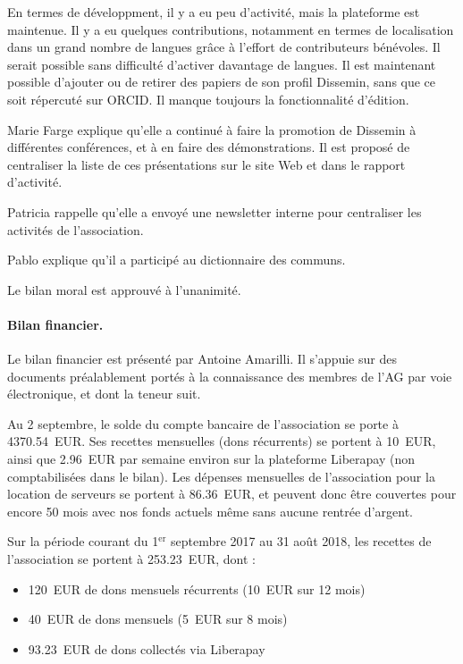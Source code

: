 \documentclass{scrartcl}
\begin{document}
En termes de développment, il y a eu peu d'activité, mais la plateforme est
maintenue. Il y a eu quelques contributions, notamment en termes de
localisation dans un grand nombre de langues grâce à l'effort de contributeurs
bénévoles. Il serait possible sans difficulté d'activer davantage de langues. Il
est maintenant possible d'ajouter ou de retirer des papiers de son profil
Dissemin, sans que ce soit répercuté sur ORCID. Il manque toujours la
fonctionnalité d'édition.

Marie Farge explique qu'elle a continué à faire la promotion de Dissemin à
différentes conférences, et à en faire des démonstrations. Il est proposé de
centraliser la liste de ces présentations sur le site Web et dans le rapport
d'activité.

Patricia rappelle qu'elle a envoyé une newsletter interne pour centraliser les
activités de l'association.

Pablo explique qu'il a participé au dictionnaire des communs.

Le bilan moral est approuvé à l'unanimité.

\paragraph{Bilan financier.} Le bilan financier est présenté par Antoine
Amarilli. Il s'appuie sur des documents préalablement portés à la connaissance des
membres de l'AG par voie électronique, et dont la teneur suit.

Au 2 septembre, le solde du compte bancaire de l'association se porte à
4370.54~EUR. Ses recettes mensuelles (dons récurrents) se portent à 10~EUR,
ainsi que 2.96~EUR par semaine environ sur la plateforme Liberapay (non
comptabilisées dans le bilan). Les dépenses mensuelles de l'association pour la
location de serveurs se portent à 86.36~EUR, et peuvent donc être couvertes pour
encore 50 mois avec nos fonds actuels même sans aucune rentrée d'argent.
 
Sur la période courant du 1$^{\mathrm{er}}$ septembre 2017 au 31 août 2018, les
recettes de l'association se portent à 253.23~EUR, dont :

\begin{itemize}
  \item 120~EUR de dons mensuels récurrents (10~EUR sur 12 mois)
  \item 40~EUR de dons mensuels (5~EUR sur 8 mois)
  \item 93.23~EUR de dons collectés via Liberapay
\end{itemize}
\end{document}
